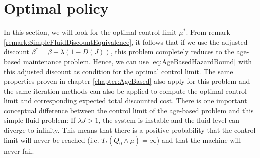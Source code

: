 \section{Optimal policy}
In this section, we will look for the optimal control limit $\mu^*$.
From remark \ref{remark:SimpleFluidDiscountEquivalence}, it follows that if we use the adjusted discount $\beta^*=\beta+\lambda(1-D(J))$, this problem completely reduces to the age-based maintenance problem.
Hence, we can use \eqref{eq:AgeBasedHazardBound} with this adjusted discount as condition for the optimal control limit.
The same properties proven in chapter \ref{chapter:AgeBased} also apply for this problem and the same iteration methods can also be applied to compute the optimal control limit and corresponding expected total discounted cost.
There is one important conceptual difference between the control limit of the age-based problem and this simple fluid problem:
If $\lambda J>1$, the system is instable and the fluid level can diverge to infinity.
This means that there is a positive probability that the control limit will never be reached (i.e. $T_t(Q_0\wedge\mu)=\infty$) and that the machine will never fail.